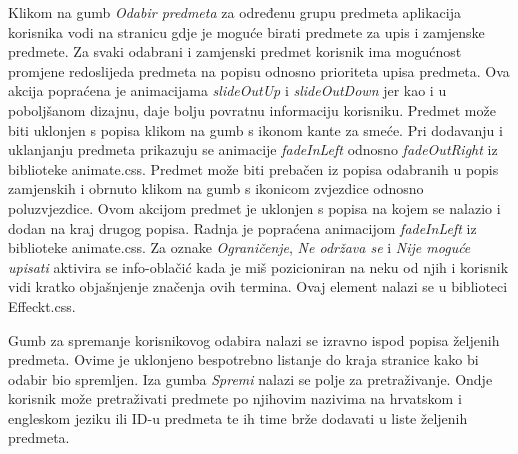 \documentclass[times, utf8, zavrsni, numeric]{fer}
\begin{document}
    Klikom na gumb \textit{Odabir predmeta} za određenu grupu predmeta aplikacija korisnika vodi na stranicu gdje je moguće birati predmete za upis i zamjenske predmete. Za svaki odabrani i zamjenski predmet korisnik ima mogućnost promjene redoslijeda predmeta na popisu odnosno prioriteta upisa predmeta. Ova akcija popraćena je animacijama \textit{slideOutUp} i \textit{slideOutDown} jer kao i u poboljšanom dizajnu, daje bolju povratnu informaciju korisniku. Predmet može biti uklonjen s popisa klikom na gumb s ikonom kante za smeće. Pri dodavanju i uklanjanju predmeta prikazuju se animacije \textit{fadeInLeft} odnosno \textit{fadeOutRight} iz biblioteke animate.css. Predmet može biti prebačen iz popisa odabranih u popis zamjenskih i obrnuto klikom na gumb s ikonicom zvjezdice odnosno poluzvjezdice. Ovom akcijom predmet je uklonjen s popisa na kojem se nalazio i dodan na kraj drugog popisa. Radnja je popraćena animacijom \textit{fadeInLeft} iz biblioteke animate.css. Za oznake \textit{Ograničenje}, \textit{Ne održava se} i \textit{Nije moguće upisati} aktivira se info-oblačić kada je miš pozicioniran na neku od njih i korisnik vidi kratko objašnjenje značenja ovih termina. Ovaj element nalazi se u biblioteci Effeckt.css.
    
    Gumb za spremanje korisnikovog odabira nalazi se izravno ispod popisa željenih predmeta. Ovime je uklonjeno bespotrebno listanje do kraja stranice kako bi odabir bio spremljen. Iza gumba \textit{Spremi} nalazi se polje za pretraživanje. Ondje korisnik može pretraživati predmete po njihovim nazivima na hrvatskom i engleskom jeziku ili ID-u predmeta te ih time brže dodavati u liste željenih predmeta.
    
\end{document}
